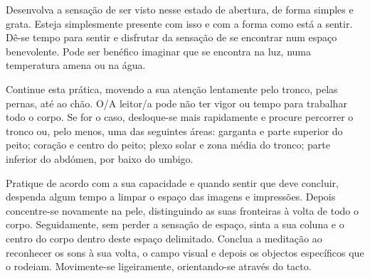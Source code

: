 Desenvolva a sensação de ser visto nesse estado de abertura, de forma simples e grata. Esteja simplesmente presente com isso e com a forma como está a sentir. Dê-se tempo para sentir e disfrutar da sensação de se encontrar num espaço benevolente. Pode ser benéfico imaginar que se encontra na luz, numa temperatura amena ou na água.

Continue esta prática, movendo a sua atenção lentamente pelo tronco, pelas pernas, até ao chão. O/A leitor/a pode não ter vigor ou tempo para trabalhar todo o corpo. Se for o caso, desloque-se mais rapidamente e procure percorrer o tronco ou, pelo menos, uma das seguintes áreas: garganta e parte superior do peito; coração e centro do peito; plexo solar e zona média do tronco; parte inferior do abdómen, por baixo do umbigo.

Pratique de acordo com a sua capacidade e quando sentir que deve concluir, despenda algum tempo a limpar o espaço das imagens e impressões. Depois concentre-se novamente na pele, distinguindo as suas fronteiras à volta de todo o corpo. Seguidamente, sem perder a sensação de espaço, sinta a sua coluna e o centro do corpo dentro deste espaço delimitado. Conclua a meditação ao reconhecer os sons à sua volta, o campo visual e depois os objectos específicos que o rodeiam. Movimente-se ligeiramente, orientando-se através do tacto.
